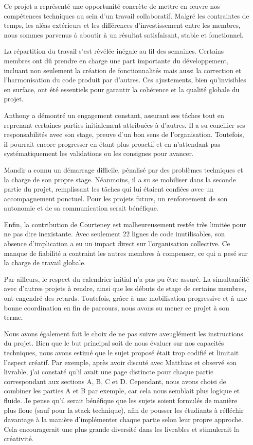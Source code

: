 \documentclass[11pt]{article}
\begin{document}
\begin{itemize}
Ce projet a représenté une opportunité concrète de mettre en œuvre nos compétences techniques au sein d’un travail collaboratif. Malgré les contraintes de temps, les aléas extérieurs et les différences d’investissement entre les membres, nous sommes parvenus à aboutir à un résultat satisfaisant, stable et fonctionnel.  

La répartition du travail s’est révélée inégale au fil des semaines. Certains membres ont dû prendre en charge une part importante du développement, incluant non seulement la création de fonctionnalités mais aussi la correction et l’harmonisation du code produit par d’autres. Ces ajustements, bien qu’invisibles en surface, ont été essentiels pour garantir la cohérence et la qualité globale du projet.  

Anthony a démontré un engagement constant, assurant ses tâches tout en reprenant certaines parties initialement attribuées à d’autres. Il a su concilier ses responsabilités avec son stage, preuve d’un bon sens de l’organisation. Toutefois, il pourrait encore progresser en étant plus proactif et en n’attendant pas systématiquement les validations ou les consignes pour avancer.  

Mandir a connu un démarrage difficile, pénalisé par des problèmes techniques et la charge de son propre stage. Néanmoins, il a su se mobiliser dans la seconde partie du projet, remplissant les tâches qui lui étaient confiées avec un accompagnement ponctuel. Pour les projets futurs, un renforcement de son autonomie et de sa communication serait bénéfique.  

Enfin, la contribution de Courteney est malheureusement restée très limitée pour ne pas dire inexistante. Avec seulement 22 lignes de code inutilisables, son absence d’implication a eu un impact direct sur l’organisation collective. Ce manque de fiabilité a contraint les autres membres à compenser, ce qui a pesé sur la charge de travail globale.

Par ailleurs, le respect du calendrier initial n’a pas pu être assuré. La simultanéité avec d’autres projets à rendre, ainsi que les débuts de stage de certains membres, ont engendré des retards. Toutefois, grâce à une mobilisation progressive et à une bonne coordination en fin de parcours, nous avons su mener ce projet à son terme.

Nous avons également fait le choix de ne pas suivre aveuglément les instructions du projet. Bien que le but principal soit de nous évaluer sur nos capacités techniques, nous avons estimé que le sujet proposé était trop codifié et limitait l'aspect créatif. Par exemple, après avoir discuté avec Matthias et observé son livrable, j'ai constaté qu'il avait une page distincte pour chaque partie correspondant aux sections A, B, C et D. Cependant, nous avons choisi de combiner les parties A et B par exemple, car cela nous semblait plus logique et fluide. Je pense qu'il serait bénéfique que les sujets soient formulés de manière plus floue (sauf pour la stack technique), afin de pousser les étudiants à réfléchir davantage à la manière d'implémenter chaque partie selon leur propre approche. Cela encouragerait une plus grande diversité dans les livrables et stimulerait la créativité.


\end{itemize}
\end{document}
